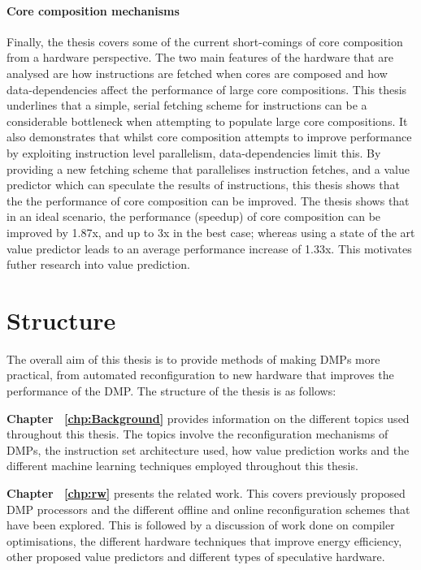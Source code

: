 \paragraph*{Core composition mechanisms} 
Finally, the thesis covers some of the current short-comings of core composition from a hardware perspective.
The two main features of the hardware that are analysed are how instructions are fetched when cores are composed and how data-dependencies affect the performance of large core compositions.
This thesis underlines that a simple, serial fetching scheme for instructions can be a considerable bottleneck when attempting to populate large core compositions.
It also demonstrates that whilst core composition attempts to improve performance by exploiting instruction level parallelism, data-dependencies limit this.
By providing a new fetching scheme that parallelises instruction fetches, and a value predictor which can speculate the results of instructions, this thesis shows that the the performance of core composition can be improved.
The thesis shows that in an ideal scenario, the performance (speedup) of core composition can be improved by 1.87x, and up to 3x in the best case; whereas using a state of the art value predictor leads to an average performance increase of 1.33x.
This motivates futher research into value prediction.

\section{Structure}
The overall aim of this thesis is to provide methods of making DMPs more practical, from automated reconfiguration to new hardware that improves the performance of the DMP.
The structure of the thesis is as follows:

\textbf{Chapter ~\ref{chp:Background}} provides information on the different topics used throughout this thesis. The topics involve the reconfiguration mechanisms of DMPs, the instruction set architecture used, how value prediction works and the different machine learning techniques employed throughout this thesis.

\textbf{Chapter ~\ref{chp:rw}} presents the related work. This covers previously proposed DMP processors and the different offline and online reconfiguration schemes that have been explored. 
This is followed by a discussion of work done on compiler optimisations, the different hardware techniques that improve energy efficiency, other proposed value predictors and different types of speculative hardware.

